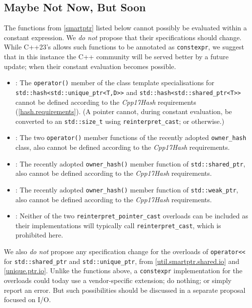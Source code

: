 \documentclass[10pt]{article}
\newcommand*{\wgxxi}[1]{[\href{https://wg21.link/#1}{#1}]}
\begin{document}
\subsection{Maybe Not Now, But Soon}
\label{sec:mnnbs}

The functions from \wgxxi{smartptr} listed below cannot possibly be evaluated
within a constant expression. We \emph{do not} propose that their
specifications should change. While C++23's \cite{P2448R2} allows such
functions to be annotated as \texttt{constexpr}, we suggest that in this
instance the C++ community will be served better by a future update; when their
constant evaluation becomes possible.

\begin{itemize}
  \item \wgxxi{util.smartptr.hash}: The \texttt{operator()} member of the class template specialisations for \texttt{std::hash<std::unique\_ptr<T,D>>} and \texttt{std::hash<std::shared\_ptr<T>>} cannot be defined according to the \emph{Cpp17Hash} requirements (\wgxxi{hash.requirements}). (A pointer cannot, during constant evaluation, be converted to an \texttt{std::size\_t} using \texttt{reinterpret\_cast}; or otherwise.)

  \item \wgxxi{util.smartptr.owner.hash}: The two \texttt{operator()} member functions of the recently adopted \texttt{owner\_hash} class, also cannot be defined according to the \emph{Cpp17Hash} requirements.

  \item \wgxxi{util.smartptr.shared.obs}: The recently adopted \texttt{owner\_hash()} member function of \texttt{std::shared\_ptr}, also cannot be defined according to the \emph{Cpp17Hash} requirements.

  \item \wgxxi{util.smartptr.weak.obs}: The recently adopted \texttt{owner\_hash()} member function of \texttt{std::weak\_ptr}, also cannot be defined according to the \emph{Cpp17Hash} requirements.

  \item \wgxxi{util.smartptr.shared.cast}: Neither of the two \texttt{reinterpret\_pointer\_cast} overloads can be included as their implementations will typically call \texttt{reinterpret\_cast}, which is prohibited here.

\end{itemize}

We also \emph{do not} propose any specification change for the overloads of
\texttt{operator<<} for \texttt{std::shared\_ptr} and
\texttt{std::unique\_ptr}, from \wgxxi{util.smartptr.shared.io} and
\wgxxi{unique.ptr.io}. Unlike the functions above, a \texttt{constexpr}
implementation for the overloads could today use a vendor-specific extension;
do nothing; or simply report an error. But such possibilities should be
discussed in a separate proposal focused on I/O.
\end{document}
